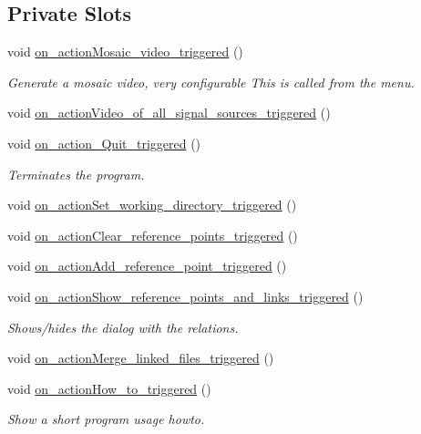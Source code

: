 \subsection*{Private Slots}
\begin{CompactItemize}
\item 
void \hyperlink{class_main_window_7d324ac19401d086a1429d0dce635508}{on\_\-actionMosaic\_\-video\_\-triggered} ()
\begin{CompactList}\small\item\em Generate a mosaic video, very configurable This is called from the menu. \item\end{CompactList}\item 
void \hyperlink{class_main_window_65b9aa01299e206a748a8b7af02bb08d}{on\_\-actionVideo\_\-of\_\-all\_\-signal\_\-sources\_\-triggered} ()
\item 
void \hyperlink{class_main_window_0b8c6952362faeeee64487be46b5ae6d}{on\_\-action\_\-Quit\_\-triggered} ()
\begin{CompactList}\small\item\em Terminates the program. \item\end{CompactList}\item 
void \hyperlink{class_main_window_e92fba12fc643c16b96c990e11167cce}{on\_\-actionSet\_\-working\_\-directory\_\-triggered} ()
\item 
void \hyperlink{class_main_window_5e16857b53830cbef0e24785364f4f64}{on\_\-actionClear\_\-reference\_\-points\_\-triggered} ()
\item 
void \hyperlink{class_main_window_3d648fd4f57ebbefb88cf62602c3ddac}{on\_\-actionAdd\_\-reference\_\-point\_\-triggered} ()
\item 
void \hyperlink{class_main_window_0ba43a595333d050a6fd6cff8565ca47}{on\_\-actionShow\_\-reference\_\-points\_\-and\_\-links\_\-triggered} ()
\begin{CompactList}\small\item\em Shows/hides the dialog with the relations. \item\end{CompactList}\item 
void \hyperlink{class_main_window_4ee2cbe325b7a9fcd3b63b73b11d8424}{on\_\-actionMerge\_\-linked\_\-files\_\-triggered} ()
\item 
void \hyperlink{class_main_window_03b81928ffe6beff45847e6de6819bc3}{on\_\-actionHow\_\-to\_\-triggered} ()
\begin{CompactList}\small\item\em Show a short program usage howto. \item\end{CompactList}\item 

\end{CompactItemize}
